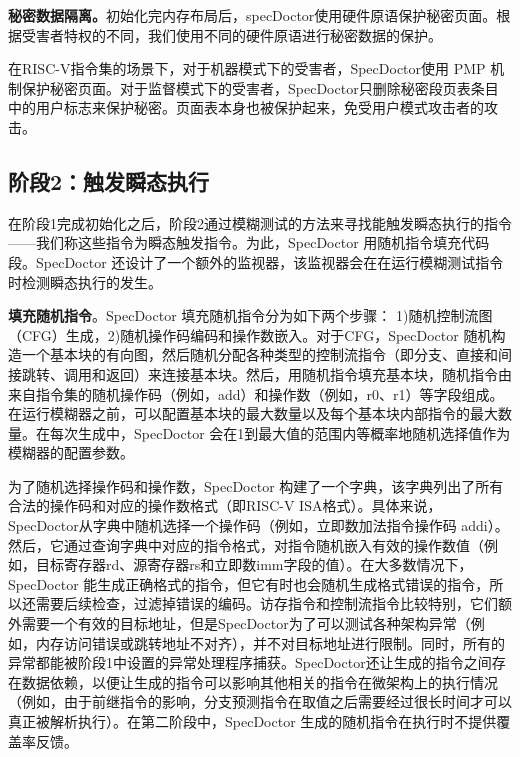 \textbf{秘密数据隔离。}初始化完内存布局后，specDoctor使用硬件原语保护秘密页面。根据受害者特权的不同，我们使用不同的硬件原语进行秘密数据的保护。\par

在RISC-V指令集的场景下，对于机器模式下的受害者，SpecDoctor使用 PMP 机制保护秘密页面。对于监督模式下的受害者，SpecDoctor只删除秘密段页表条目中的用户标志来保护秘密。页面表本身也被保护起来，免受用户模式攻击者的攻击。\par

\subsection{阶段2：触发瞬态执行}

在阶段1完成初始化之后，阶段2通过模糊测试的方法来寻找能触发瞬态执行的指令——我们称这些指令为瞬态触发指令。为此，SpecDoctor 用随机指令填充代码段。SpecDoctor 还设计了一个额外的监视器，该监视器会在在运行模糊测试指令时检测瞬态执行的发生。\par

\textbf{填充随机指令}。SpecDoctor 填充随机指令分为如下两个步骤： 1)随机控制流图（CFG）生成，2)随机操作码编码和操作数嵌入。对于CFG，SpecDoctor 随机构造一个基本块的有向图，然后随机分配各种类型的控制流指令（即分支、直接和间接跳转、调用和返回）来连接基本块。然后，用随机指令填充基本块，随机指令由来自指令集的随机操作码（例如，add）和操作数（例如，r0、r1）等字段组成。在运行模糊器之前，可以配置基本块的最大数量以及每个基本块内部指令的最大数量。在每次生成中，SpecDoctor 会在1到最大值的范围内等概率地随机选择值作为模糊器的配置参数。\par

为了随机选择操作码和操作数，SpecDoctor 构建了一个字典，该字典列出了所有合法的操作码和对应的操作数格式（即RISC-V ISA格式）。具体来说，SpecDoctor从字典中随机选择一个操作码（例如，立即数加法指令操作码 addi）。然后，它通过查询字典中对应的指令格式，对指令随机嵌入有效的操作数值（例如，目标寄存器rd、源寄存器rs和立即数imm字段的值）。在大多数情况下，SpecDoctor 能生成正确格式的指令，但它有时也会随机生成格式错误的指令，所以还需要后续检查，过滤掉错误的编码。访存指令和控制流指令比较特别，它们额外需要一个有效的目标地址，但是SpecDoctor为了可以测试各种架构异常（例如，内存访问错误或跳转地址不对齐），并不对目标地址进行限制。同时，所有的异常都能被阶段1中设置的异常处理程序捕获。SpecDoctor还让生成的指令之间存在数据依赖，以便让生成的指令可以影响其他相关的指令在微架构上的执行情况（例如，由于前继指令的影响，分支预测指令在取值之后需要经过很长时间才可以真正被解析执行）。在第二阶段中，SpecDoctor 生成的随机指令在执行时不提供覆盖率反馈。\par

